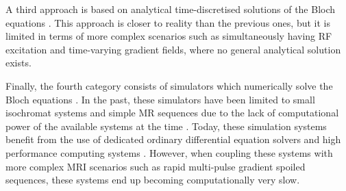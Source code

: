 \hfill

A third approach is based on analytical time-discretised solutions of the Bloch equations \cite{Bittoun1984} \cite{Kwan1999} \cite{Yoder2004} \cite{Drobnjak2006} \cite{Jochimsen2006} \cite{Liu2017}.
This approach is closer to reality than the previous ones, but it is limited in terms of more complex scenarios such as simultaneously having RF excitation and time-varying gradient fields, where no general analytical solution exists.

\hfill

Finally, the fourth category consists of simulators which numerically solve the Bloch equations \cite{Olsson1995} \cite{Summers1986} \cite{Stocker2010}.
In the past, these simulators have been limited to small isochromat systems and simple MR sequences due to the lack of computational power of the available systems at the time \cite{Olsson1995} \cite{Summers1986}.
Today, these simulation systems benefit from the use of dedicated ordinary differential equation solvers and high performance computing systems
\cite{Stocker2010} \cite{Fortin2016}.
However, when coupling these systems with more complex MRI scenarios such as rapid multi-pulse gradient spoiled sequences, these systems end up becoming computationally very slow.




